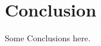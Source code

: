 \documentclass[unnumsec,webpdf,modern,large]{mam-authoring-template}%
\theoremstyle{thmstyleone}%
\theoremstyle{thmstyletwo}%
\theoremstyle{thmstylethree}%
\newtheorem{definition}{Definition}
\begin{document}
	
	
	
	
	\noindent
	
	\section{Conclusion}
	
	Some Conclusions here.
	
	
\end{document}
